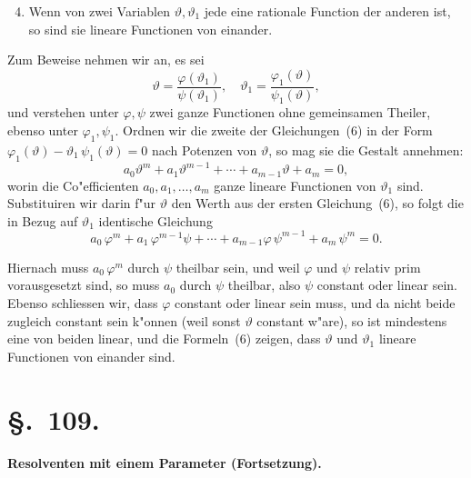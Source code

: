 \documentclass[12pt,a4paper]{article}
\theoremstyle{plain}
\begin{document}
\begin{enumerate}[label=\arabic*.]
\setcounter{enumi}{3}
\item Wenn von zwei Variablen $\vartheta, \vartheta_1$ jede eine rationale Function der anderen ist, so sind sie lineare Functionen von einander.
\end{enumerate}

Zum Beweise nehmen wir an, es sei
\begin{equation}\tag{6}
\vartheta = \frac{\varphi(\vartheta_1)}{\psi(\vartheta_1)}, \quad \vartheta_1 = \frac{\varphi_1(\vartheta)}{\psi_1(\vartheta)},
\end{equation}
und verstehen unter $\varphi, \psi$ zwei ganze Functionen ohne gemeinsamen Theiler, ebenso unter $\varphi_1, \psi_1$. Ordnen wir die zweite der Gleichungen~(6) in der Form $\varphi_1(\vartheta) - \vartheta_1\,\psi_1(\vartheta) = 0$ nach Potenzen von $\vartheta$, so mag sie die Gestalt annehmen:
\[a_0\vartheta^m + a_1\vartheta^{m-1} + \cdots + a_{m-1}\vartheta + a_m = 0,\]
worin die Co"efficienten $a_0, a_1, \ldots, a_m$ ganze lineare Functionen von $\vartheta_1$ sind. Substituiren wir darin f"ur $\vartheta$ den Werth aus der ersten Gleichung~(6), so folgt die in Bezug auf $\vartheta_1$ identische Gleichung
\[a_0\,\varphi^m + a_1\,\varphi^{m-1}\psi + \cdots + a_{m-1}\varphi\,\psi^{m-1} + a_m\,\psi^m = 0.\]

Hiernach muss $a_0\,\varphi^m$ durch $\psi$ theilbar sein, und weil $\varphi$ und $\psi$ relativ prim vorausgesetzt sind, so muss $a_0$ durch $\psi$ theilbar, also $\psi$ constant oder linear sein. Ebenso schliessen wir, dass $\varphi$ constant oder linear sein muss, und da nicht beide zugleich constant sein k"onnen (weil sonst $\vartheta$ constant w"are), so ist mindestens eine von beiden linear, und die Formeln~(6) zeigen, dass $\vartheta$ und $\vartheta_1$ lineare Functionen von einander sind.

\section*{\S.~109.}
\begin{center}
\large\bfseries Resolventen mit einem Parameter (Fortsetzung).
\end{center}
\vspace{0.5em}
\end{document}
